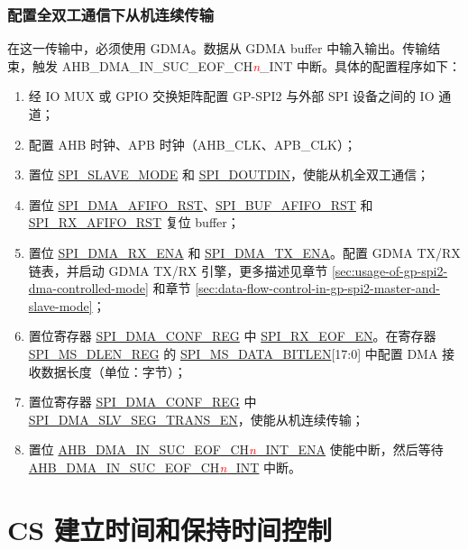 \documentclass[main\_\_CN.tex]{subfiles}
\begin{document}
\subsubsection{配置全双工通信下从机连续传输}\label{sec:gp-spi2-slave-fd-seg-trans}
在这一传输中，必须使用 GDMA。数据从 GDMA buffer 中输入输出。传输结束，触发 AHB\_DMA\_IN\_SUC\_EOF\_CH\textcolor{red}{\it{n}}\_INT 中断。具体的配置程序如下：

\begin{enumerate}
    \item 经 IO MUX 或 GPIO 交换矩阵配置 GP-SPI2 与外部 SPI 设备之间的 IO 通道；
    \item 配置 AHB 时钟、APB 时钟（AHB\_CLK、APB\_CLK）；
    \item 置位 \hyperref[fielddesc:SPISLAVEMODE]{SPI\_SLAVE\_MODE} 和 \hyperref[fielddesc:SPIDOUTDIN]{SPI\_DOUTDIN}，使能从机全双工通信；
    \item 置位 \hyperref[fielddesc:SPIDMAAFIFORST]{SPI\_DMA\_AFIFO\_RST}、\hyperref[fielddesc:SPIBUFAFIFORST]{SPI\_BUF\_AFIFO\_RST} 和 \hyperref[fielddesc:SPIRXAFIFORST]{SPI\_RX\_AFIFO\_RST} 复位 buffer；
    \item 置位 \hyperref[fielddesc:SPIDMARXENA]{SPI\_DMA\_RX\_ENA} 和 \hyperref[fielddesc:SPIDMATXENA]{SPI\_DMA\_TX\_ENA}。配置 GDMA TX/RX 链表，并启动 GDMA TX/RX 引擎，更多描述见章节 \ref{sec:usage-of-gp-spi2-dma-controlled-mode} 和章节 \ref{sec:data-flow-control-in-gp-spi2-master-and-slave-mode}；
    \item 置位寄存器 \hyperref[regdesc:SPIDMACONFREG]{SPI\_DMA\_CONF\_REG} 中 \hyperref[fielddesc:SPIRXEOFEN]{SPI\_RX\_EOF\_EN}。在寄存器 \hyperref[regdesc:SPIMSDLENREG]{SPI\_MS\_DLEN\_REG} 的 \hyperref[fielddesc:SPIMSDATABITLEN]{SPI\_MS\_DATA\_BITLEN}[17:0] 中配置 DMA 接收数据长度（单位：字节）；
    
    \item 置位寄存器 \hyperref[regdesc:SPIDMACONFREG]{SPI\_DMA\_CONF\_REG} 中 \hyperref[fielddesc:SPIDMASLVSEGTRANSEN]{SPI\_DMA\_SLV\_SEG\_TRANS\_EN}，使能从机连续传输；
    
    \item 置位 \hyperref[fielddesc:AHBDMAINSUCEOFCHNINTENA]{AHB\_DMA\_IN\_SUC\_EOF\_CH\textcolor{red}{\it{n}}\_INT\_ENA}  使能中断，然后等待 \hyperref[int:GDMAINSUCEOFINT]{AHB\_DMA\_IN\_SUC\_EOF\_CH\textcolor{red}{\it{n}}\_INT} 中断。
\end{enumerate}


\section{CS 建立时间和保持时间控制}\label{sec:gp-spi2-cs-timing}
\end{document}
